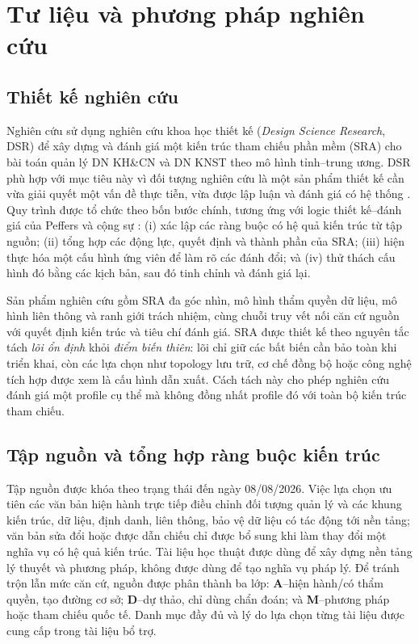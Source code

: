 \section{Tư liệu và phương pháp nghiên cứu}
\label{sec:method}

\subsection{Thiết kế nghiên cứu}
\label{subsec:dsr}

Nghiên cứu sử dụng nghiên cứu khoa học thiết kế (\textit{Design Science Research}, DSR) để xây dựng và đánh giá một kiến trúc tham chiếu phần mềm (SRA) cho bài toán quản lý DN KH\&CN và DN KNST theo mô hình tỉnh--trung ương. DSR phù hợp với mục tiêu này vì đối tượng nghiên cứu là một sản phẩm thiết kế cần vừa giải quyết một vấn đề thực tiễn, vừa được lập luận và đánh giá có hệ thống \citep[pp.~82--83]{hevner2004}. Quy trình được tổ chức theo bốn bước chính, tương ứng với logic thiết kế--đánh giá của Peffers và cộng sự \citep[pp.~52--56]{peffers2007}: (i) xác lập các ràng buộc có hệ quả kiến trúc từ tập nguồn; (ii) tổng hợp các động lực, quyết định và thành phần của SRA; (iii) hiện thực hóa một cấu hình ứng viên để làm rõ các đánh đổi; và (iv) thử thách cấu hình đó bằng các kịch bản, sau đó tinh chỉnh và đánh giá lại.

Sản phẩm nghiên cứu gồm SRA đa góc nhìn, mô hình thẩm quyền dữ liệu, mô hình liên thông và ranh giới trách nhiệm, cùng chuỗi truy vết nối căn cứ nguồn với quyết định kiến trúc và tiêu chí đánh giá. SRA được thiết kế theo nguyên tắc tách \emph{lõi ổn định} khỏi \emph{điểm biến thiên}: lõi chỉ giữ các bất biến cần bảo toàn khi triển khai, còn các lựa chọn như topology lưu trữ, cơ chế đồng bộ hoặc công nghệ tích hợp được xem là cấu hình dẫn xuất. Cách tách này cho phép nghiên cứu đánh giá một profile cụ thể mà không đồng nhất profile đó với toàn bộ kiến trúc tham chiếu.

\subsection{Tập nguồn và tổng hợp ràng buộc kiến trúc}
\label{subsec:corpus}

Tập nguồn được khóa theo trạng thái đến ngày 08/08/2026. Việc lựa chọn ưu tiên các văn bản hiện hành trực tiếp điều chỉnh đối tượng quản lý và các khung kiến trúc, dữ liệu, định danh, liên thông, bảo vệ dữ liệu có tác động tới nền tảng; văn bản sửa đổi hoặc được dẫn chiếu chỉ được bổ sung khi làm thay đổi một nghĩa vụ có hệ quả kiến trúc. Tài liệu học thuật được dùng để xây dựng nền tảng lý thuyết và phương pháp, không được dùng để tạo nghĩa vụ pháp lý. Để tránh trộn lẫn mức căn cứ, nguồn được phân thành ba lớp: \textbf{A}--hiện hành/có thẩm quyền, tạo đường cơ sở; \textbf{D}--dự thảo, chỉ dùng chẩn đoán; và \textbf{M}--phương pháp hoặc tham chiếu quốc tế. Danh mục đầy đủ và lý do lựa chọn từng tài liệu được cung cấp trong tài liệu bổ trợ.

